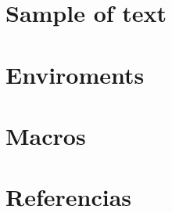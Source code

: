 \documentclass[14pt,executivepaper]{extbook} %
\begin{document}
\mainmatter 

\cleardoublepage %
\pagestyle{fancy} %


\part{Sample of text}



\part{Enviroments}




\part{Macros}





\backmatter

\part{Referencias}


\end{document}
